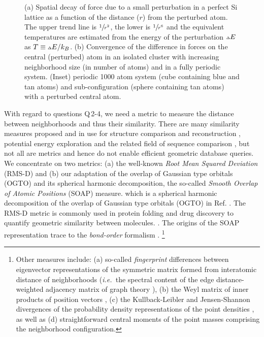 \documentclass[journal=jctcce,manuscript=article]{achemso}
\newlength{\figwidth}
\newcommand{\figpath}{Figures}
\newcommand{\cref}[1]{{Ref. \citenum{#1}}}
\newcommand{\ie}{{\it i.e.\ }}
\newcommand{\smallDelta}{\mathsmaller{\mathsmaller{\Delta}}}
\begin{document}
\begin{figure}[h]
\centering
{}
\caption{(a) Spatial decay of force due to a small perturbation in a perfect Si lattice as a function of the distance ($r$) from the perturbed atom.
The upper trend line is $\sfrac{1}{r^2}$, the lower is $\sfrac{1}{r^6}$ and the equivalent temperatures are estimated from the energy of the perturbation $\smallDelta E$ as $T \equiv \smallDelta E / k_B$.
(b) Convergence of the difference in forces on the central (perturbed) atom in an isolated cluster with increasing neighborhood size (in number of atoms) and in a fully periodic system.
(Inset) periodic 1000 atom system (cube containing blue and tan atoms) and sub-configuration (sphere containing tan atoms) with a perturbed central atom.  
}
\label{fig:force_perturbation}
\end{figure}

With regard to questions Q\,2-4, we need a metric to measure the distance between neighborhoods and thus their similarity.
There are many similarity measures proposed and in use for structure comparison and reconstruction \cite{Fogolari2012,Hung2012}, potential energy exploration \cite{Bartok_PhysRevB_2013,de2014relation} and the related field of sequence comparison \cite{Levitt1998,Baudet2012}, but not all are metrics and hence do not enable efficient geometric database queries.
We concentrate on two metrics: (a) the well-known \emph{Root Mean Squared Deviation} (RMS-D) and (b) our adaptation of the overlap of Gaussian type orbitals (OGTO) \cite{sadeghi2013metrics} and its spherical harmonic decomposition, the so-called \emph{Smooth Overlap of Atomic Positions} (SOAP) \cite{Bartok_PhysRevB_2013} measure. 
which is a spherical harmonic decomposition of the overlap of Gaussian type orbitals (OGTO) in \cref{sadeghi2013metrics}.
The RMS-D metric is commonly used in protein folding and drug discovery to quantify geometric similarity between molecules. \cite{Drineas2006,Hung2012,Carugo2007,Lindorff2009,Fogolari2012,sadeghi2013metrics}.
The origins of the SOAP representation trace to the \emph{bond-order} formalism \cite{Pettifor1989}.
\footnote{
Other measures include: 
(a) so-called \emph{fingerprint} differences between eigenvector representations of the symmetric matrix formed from interatomic distance of neighborhoods \cite{sadeghi2013metrics,de2014relation}  (\ie the spectral content of the edge distance-weighted adjacency matrix of graph theory \cite{vishveshwara2002protein,gutman1973graph}), 
(b) the Weyl matrix of inner products of position vectors \cite{Bartok_PhysRevB_2013},
(c) the Kullback-Leibler and Jensen-Shannon divergences of the probability density representations of the point densities \cite{Lindorff2009}, 
as well as (d) straightforward central moments of the point masses comprising the neighborhood configuration.
}
\end{document}
